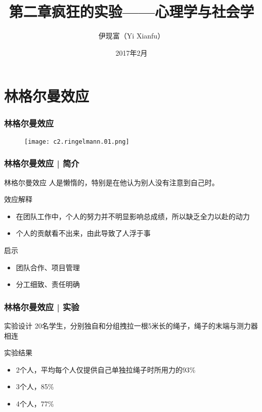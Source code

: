 



\title[心理学与社会学]{第二章\quad 疯狂的实验——心理学与社会学}
\author[Yixf]{伊现富（Yi Xianfu）}
\date{2017年2月}



\section{林格尔曼效应}
\begin{frame}
  \frametitle{林格尔曼效应}
  \begin{figure}
    \centering
    \texttt{[image: c2.ringelmann.01.png]}
  \end{figure}
\end{frame}

\begin{frame}
  \frametitle{林格尔曼效应 | 简介}
  \begin{block}{林格尔曼效应}
    人是懒惰的，特别是在他认为别人没有注意到自己时。
  \end{block}
  \pause
  \begin{block}{效应解释}
    \begin{itemize}
      \item 在团队工作中，个人的努力并不明显影响总成绩，所以缺乏全力以赴的动力
      \item 个人的贡献看不出来，由此导致了人浮于事
    \end{itemize}
  \end{block}
  \pause
  \begin{block}{启示}
    \begin{itemize}
      \item 团队合作、项目管理
      \item 分工细致、责任明确
    \end{itemize}
  \end{block}
\end{frame}

\begin{frame}
  \frametitle{林格尔曼效应 | 实验}
  \begin{block}{实验设计}
      20名学生，分别独自和分组拽拉一根5米长的绳子，绳子的末端与测力器相连
  \end{block}
  \pause
  \begin{block}{实验结果}
    \begin{itemize}
      \item 2个人，平均每个人仅提供自己单独拉绳子时所用力的93\%
      \item 3个人，85\%
      \item 4个人，77\%
    \end{itemize}
  \end{block}
\end{frame}

